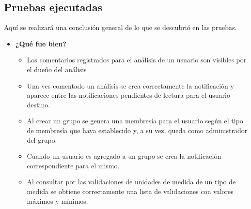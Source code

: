 \subsection{Pruebas ejecutadas}
Aquí se realizará una conclusión general de lo que se descubrió en las pruebas.
	\begin{itemize}
		\item \textbf{¿Qué fue bien?}
        	\begin{itemize}
				\item  Los comentarios registrados para el análisis de un usuario son visibles por el dueño del análisis
				\item Una ves comentado un análisis se crea correctamente la notificación y aparece entre las notificaciones pendientes de lectura para el usuario destino.
				\item Al crear un grupo se genera una membresía para el usuario según el tipo de membresía que haya establecido y, a su vez, queda como administrador del grupo. 
				\item Cuando un usuario es agregado a un grupo se crea la notificación correspondiente para el mismo.
				\item Al consultar por las validaciones de unidades de medida de un tipo de medida se obtiene correctamente una lista de validaciones con valores máximos y mínimos.
			\end{itemize}


\end{itemize}
